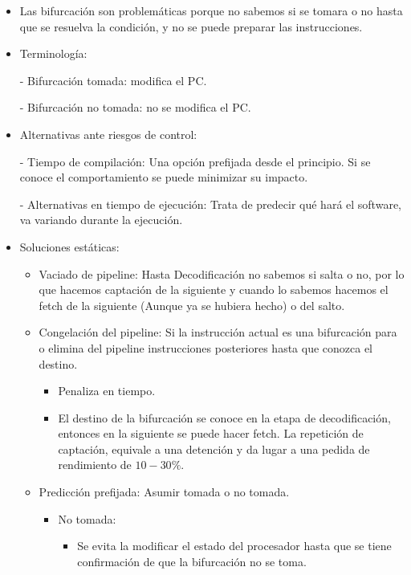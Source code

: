 \documentclass[12pt, twoside, openright]{report} %
\begin{document}
    \begin{itemize}
      \item Las bifurcación son problemáticas porque no sabemos si se tomara o no hasta que se resuelva la condición, y no se puede preparar las instrucciones.
      \item Terminología:
          
      - Bifurcación tomada: modifica el PC.
         
      - Bifurcación no tomada: no se modifica el PC.
      \item Alternativas ante riesgos de control:
          
      - Tiempo de compilación: Una opción prefijada desde el principio. Si se conoce el comportamiento se puede minimizar su impacto.
          
      - Alternativas en tiempo de ejecución: Trata de predecir qué hará el software, va variando durante la ejecución.
      \item Soluciones estáticas:
      \begin{itemize}
        \item Vaciado de pipeline: Hasta Decodificación no sabemos si salta o no, por lo que hacemos captación de la siguiente y cuando lo sabemos hacemos el fetch de la siguiente (Aunque ya se hubiera hecho) o del salto.
        \item Congelación del pipeline: Si la instrucción actual es una bifurcación para o elimina del pipeline instrucciones posteriores hasta que conozca el destino.
        \begin{itemize}
          \item Penaliza en tiempo.

          \item El destino de la bifurcación se conoce en la etapa de decodificación, entonces en la siguiente se puede hacer fetch. La repetición de captación, equivale a una detención y da lugar a una pedida de rendimiento de $10-30\%$.
        \end{itemize}
            
        \item Predicción prefijada: Asumir tomada o no tomada.
        \begin{itemize}
          \item No tomada:
            \begin{itemize}
              \item Se evita la modificar el estado del procesador hasta que se tiene confirmación de que la bifurcación no se toma.


\end{itemize}
\end{itemize}
\end{itemize}
\end{itemize}
\end{document}
